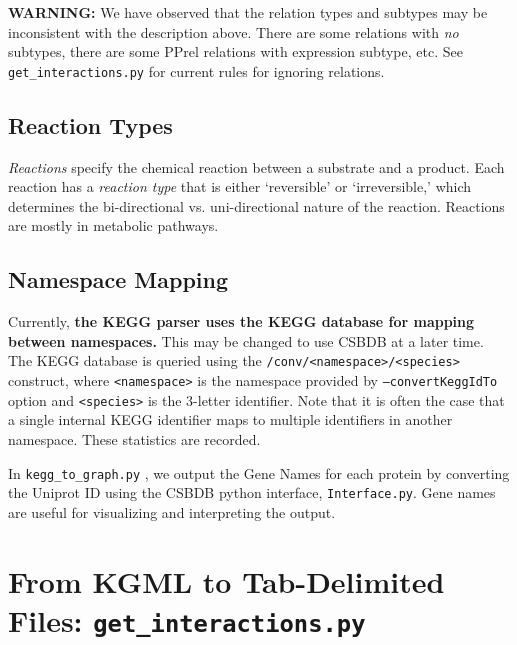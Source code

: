 \documentclass[10pt]{article}
\newcommand{\getinteractions}{\texttt{get\_interactions.py} }
\newcommand{\keggtograph}{\texttt{kegg\_to\_graph.py} }
\begin{document}
\noindent \textbf{WARNING:} We have observed that the relation types and subtypes may be inconsistent with the description above.  There are some relations with \emph{no} subtypes, there are some PPrel relations with expression subtype, etc. See \getinteractions for current rules for ignoring relations.

\subsection{Reaction Types}

\emph{Reactions} specify the chemical reaction between a substrate and a product.  Each reaction has a \emph{reaction type} that is either `reversible' or `irreversible,' which determines the bi-directional vs. uni-directional nature of the reaction. Reactions are mostly in metabolic pathways.

\subsection{Namespace Mapping}

Currently, \textbf{the KEGG parser uses the KEGG database for mapping between namespaces.}  This may be changed to use CSBDB at a later time.  The KEGG database is queried using the \texttt{/conv/<namespace>/<species>} construct, where \texttt{<namespace>} is the namespace provided by \texttt{--convertKeggIdTo} option and \texttt{<species>} is the 3-letter identifier.  Note that it is often the case that a single internal KEGG identifier maps to multiple identifiers in another namespace.  These statistics are recorded.

In \keggtograph, we output the Gene Names for each protein by converting the Uniprot ID using the CSBDB python interface, \texttt{Interface.py}.  Gene names are useful for visualizing and interpreting the output. 

\section{From KGML to Tab-Delimited Files: \getinteractions}
\end{document}
